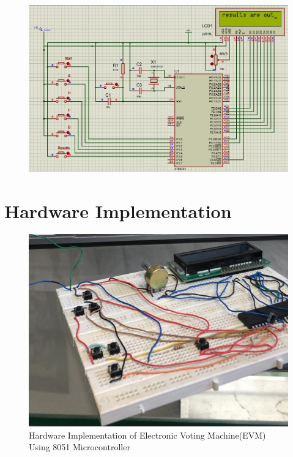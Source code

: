 \begin{figure}[H]  %
\begin{center}
\includegraphics[scale=0.50]{Chapter4/simulation9}
\end{center}
\end{figure}
\section{Hardware Implementation}
\begin{figure}[H]  %
\begin{center}
\includegraphics[scale=0.65]{Chapter4/hardware1}
\caption{Hardware Implementation of Electronic Voting Machine(EVM) Using 8051 Microcontroller}
\label{hardware1}
\end{center}
\end{figure}
